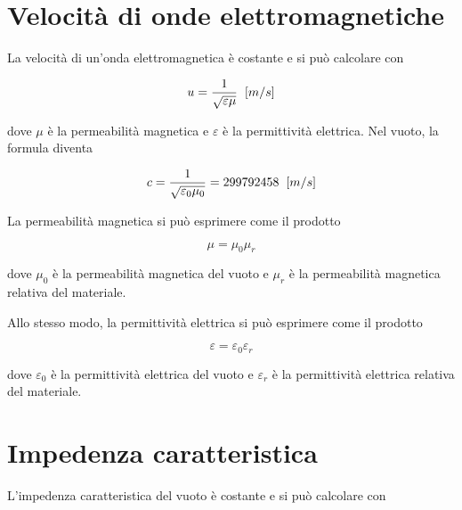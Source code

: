 \documentclass{article}
\begin{document}
    \section{Velocità di onde elettromagnetiche}

    La velocità di un'onda elettromagnetica è costante e si può calcolare con

    \begin{equation}
        u = \frac{1}{\sqrt{\varepsilon \mu}} \hspace{0.2cm} [m/s]
    \end{equation}

    dove $\mu$ è la permeabilità magnetica e $\varepsilon$ è la permittività elettrica.
    Nel vuoto, la formula diventa

    \begin{equation}
        c = \frac{1}{\sqrt{\varepsilon_0 \mu_0}} = 299 792 458 \hspace{0.2cm} [m/s]
    \end{equation}

    \vspace{1cm}

    La permeabilità magnetica si può esprimere come il prodotto

    \begin{equation}
        \mu = \mu_0 \mu_r
    \end{equation}

    dove $\mu_0$ è la permeabilità magnetica del vuoto e $\mu_r$ è la permeabilità magnetica relativa
    del materiale.

    \vspace{1cm}

    Allo stesso modo, la permittività elettrica si può esprimere come il prodotto

    \begin{equation}
        \varepsilon = \varepsilon_0 \varepsilon_r
    \end{equation}

    dove $\varepsilon_0$ è la permittività elettrica del vuoto e $\varepsilon_r$ è la permittività elettrica relativa
    del materiale.

    \section{Impedenza caratteristica}

    L'impedenza caratteristica del vuoto è costante e si può calcolare con
\end{document}
